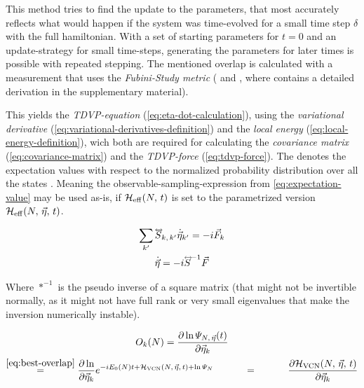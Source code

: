 This method tries to find the update to the parameters, that most accurately reflects what would happen if the system was time-evolved for a small time step $\delta$ with the full hamiltonian.
With a set of starting parameters for $t=0$ and an update-strategy for small time-steps, generating the parameters for later times is possible with repeated stepping.
The mentioned overlap is calculated with a measurement that uses the \emph{Fubini-Study metric} (\cite{variationalClassicalNetworksPaper} and \cite{probabilitySamplingRequirementVCN}, where \cite{probabilitySamplingRequirementVCN} contains a detailed derivation in the supplementary material).

This yields the \emph{TDVP-equation} (\autoref{eq:eta-dot-calculation}), using the \emph{variational derivative} (\autoref{eq:variational-derivatives-definition}) and the \emph{local energy} (\autoref{eq:local-energy-definition}), wich both are required for calculating the \emph{covariance matrix} (\autoref{eq:covariance-matrix}) and the \emph{TDVP-force} (\autoref{eq:tdvp-force}).
The \etaExpectationVal{\ast} denotes the expectation values with respect to the normalized probability distribution over all the states  \cite{probabilitySamplingRequirementVCN}.
Meaning the observable-sampling-expression from \autoref{eq:expectation-value} may be used as-is, if $\HeffOft$ is set to the parametrized version $\HeffOft[N,\,\vec{\eta}]$.

\begin{equation}
    \label{eq:eta-dot-calculation}
    \begin{gathered}
        \lsum[k'] \matvec{S}_{k,\, k'} \dot{\vec{\eta}}_{k'} = -i \vec{F}_k\\
        \dot{\vec{\eta}} = -i {\matvec{S}}^{-1} \vec{F}
    \end{gathered}
\end{equation}

Where $\ast^{-1}$ is the pseudo inverse of a square matrix (that might not be invertible normally, as it might not have full rank or very small eigenvalues that make the inversion numerically instable).

\begin{equation}
    \label{eq:variational-derivatives-definition}
    \begin{gathered}
        O_{k}(N) = \frac{\partial \ln \psiEta{N,\,\vec{\eta}}{t}}{\partial \vec{\eta}_k}\\
        \stackrel{\ref{eq:best-overlap}}{=} \frac{\partial \ln }{\partial \vec{\eta}_k} e^{-i E_0(N) t + \HvcnOft{\vec{\eta}} + \ln \psiN} 
        \stackrel{\phantom{\ref{eq:best-overlap}}}{=} 
        \frac{\partial \HvcnOft{\vec{\eta}} }{\partial \vec{\eta}_k} 
    \end{gathered}
\end{equation}

